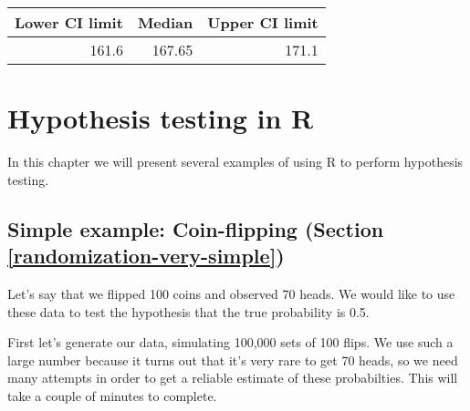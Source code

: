 \documentclass[12pt,]{book}
\begin{document}
\begin{tabular}{r|r|r}
\hline
Lower CI limit & Median & Upper CI limit\\
\hline
161.6 & 167.65 & 171.1\\
\hline
\end{tabular}

\hypertarget{hypothesis-testing-in-r}{%
\chapter{Hypothesis testing in R}\label{hypothesis-testing-in-r}}

In this chapter we will present several examples of using R to perform hypothesis testing.

\hypertarget{simple-example-coin-flipping-section-refrandomization-very-simple}{%
\section{Simple example: Coin-flipping (Section \ref{randomization-very-simple})}\label{simple-example-coin-flipping-section-refrandomization-very-simple}}

Let's say that we flipped 100 coins and observed 70 heads. We would like to use these data to test the hypothesis that the true probability is 0.5.

First let's generate our data, simulating 100,000 sets of 100 flips. We use such a large number because it turns out that it's very rare to get 70 heads, so we need many attempts in order to get a reliable estimate of these probabilties. This will take a couple of minutes to complete.
\end{document}
